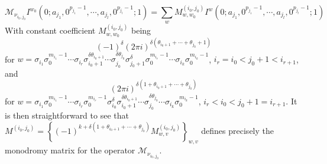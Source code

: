 \begin{theorem}
\begin{equation}
\mathcal M_{\nu_{i_0,j_0}}I^{w_0}(0;a_{j_1},0^{p_{j_1}-1},\cdots,a_{j_l},0^{p_{j_l}-1};1)=\sum_{w}M^{(i_0,j_0)}_{w,w_0}I^{w}(0;a_{j_1},0^{p_{j_1}-1},\cdots,a_{j_l},0^{p_{j_l}-1};1)
\end{equation}
With constant coefficient $M^{(i_0,j_0)}_{w,w_0}$ being
\begin{equation}
(-1)^\delta(2\pi i)^{\delta(\theta_{i_0+1}+\cdots+\theta_{j_0}+1)}
\end{equation}
for $w=\sigma_{i_1}\sigma_0^{m_{i_1}-1}\cdots\sigma_{i_r}\sigma_{i_0+1}^{\delta\theta_{i_0+1}}\cdots\sigma_{j_0}^{\delta\theta_{j_0}}\sigma_{j_0+1}^\delta\sigma_0^{m_{i_r}-1}\cdots\sigma_{i_k}\sigma_0^{m_{i_k}-1}$, $i_r=i_0<j_0+1<i_{r+1}$, and
\begin{equation}
(2\pi i)^{\delta(1+\theta_{i_0+1}+\cdots+\theta_{j_0})}
\end{equation}
for $w=\sigma_{i_1}\sigma_0^{m_{i_1}-1}\cdots\sigma_{i_r}\sigma_0^{m_{i_r}-1}\sigma_{i_0}^\delta\sigma_{i_0+1}^{\delta\theta_{i_0+1}}\cdots\sigma_{j_0}^{\delta\theta_{j_0}}\cdots\sigma_{i_k}\sigma_0^{m_{i_k}-1}$, $i_r<i_0<j_0+1=i_{r+1}$. It is then straightforward to see that $M^{(i_0,j_0)}=\left\{(-1)^{k+\delta(1+\theta_{i_0+1}+\cdots+\theta_{j_0})}M^{(i_0,j_0)}_{w,v}\right\}_{w,v}$ defines precisely the monodromy matrix for the operator $\mathcal M_{\nu_{i_0,j_0}}$.
\end{theorem}


